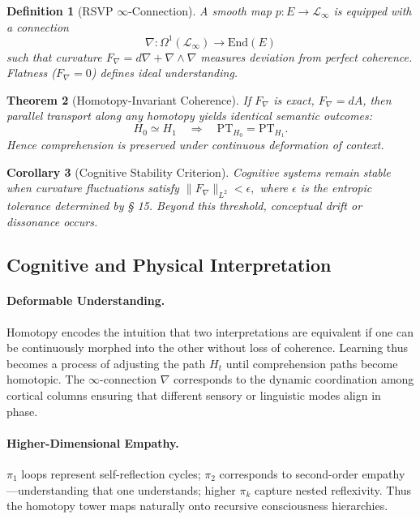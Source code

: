\documentclass[12pt,a4paper,twoside,openright]{book}
\newtheorem{theorem}{Theorem}
\newtheorem{definition}[theorem]{Definition}
\newtheorem{corollary}[theorem]{Corollary}
\begin{document}
\begin{definition}[RSVP \texorpdfstring{$\infty$}{∞}-Connection]
A smooth map $p\colon E\to \mathcal{L}_\infty$ is equipped with a connection
\[
\nabla\colon \Omega^1(\mathcal{L}_\infty)\to \mathrm{End}(E)
\]
such that curvature $F_\nabla = d\nabla + \nabla\!\wedge\!\nabla$
measures deviation from perfect coherence.  
Flatness ($F_\nabla=0$) defines ideal understanding.
\end{definition}

\begin{theorem}[Homotopy-Invariant Coherence]
If $F_\nabla$ is exact, $F_\nabla=dA$, then parallel transport along any homotopy yields identical semantic outcomes:
\[
H_0\simeq H_1\quad\Rightarrow\quad
\mathrm{PT}_{H_0}=\mathrm{PT}_{H_1}.
\]
Hence comprehension is preserved under continuous deformation of context.
\end{theorem}

\begin{corollary}[Cognitive Stability Criterion]
Cognitive systems remain stable when curvature fluctuations satisfy
\(
\|F_\nabla\|_{L^2}<\epsilon,
\)
where $\epsilon$ is the entropic tolerance determined by § 15.
Beyond this threshold, conceptual drift or dissonance occurs.
\end{corollary}

\subsection*{Cognitive and Physical Interpretation}

\paragraph{Deformable Understanding.}
Homotopy encodes the intuition that two interpretations are equivalent if one can be continuously morphed into the other without loss of coherence.  
Learning thus becomes a process of adjusting the path $H_t$ until comprehension paths become homotopic.  
The $\infty$-connection $\nabla$ corresponds to the dynamic coordination among cortical columns ensuring that different sensory or linguistic modes align in phase.

\paragraph{Higher-Dimensional Empathy.}
$\pi_1$ loops represent self-reflection cycles; $\pi_2$ corresponds to second-order empathy—understanding that one understands; higher $\pi_k$ capture nested reflexivity.  
Thus the homotopy tower maps naturally onto recursive consciousness hierarchies.
\end{document}
